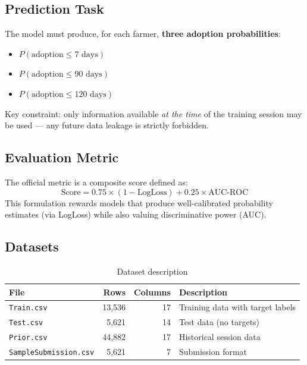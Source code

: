 \documentclass[12pt,a4paper]{article}
\begin{document}
\subsection{Prediction Task}

The model must produce, for each farmer, \textbf{three adoption probabilities}:
\begin{itemize}[noitemsep]
    \item $P(\text{adoption} \leq 7 \text{ days})$
    \item $P(\text{adoption} \leq 90 \text{ days})$
    \item $P(\text{adoption} \leq 120 \text{ days})$
\end{itemize}

\noindent Key constraint: only information available \textit{at the time} of the training session may be used --- any future data leakage is strictly forbidden.

\subsection{Evaluation Metric}

The official metric is a composite score defined as:
\begin{equation}
    \text{Score} = 0.75 \times (1 - \text{LogLoss}) + 0.25 \times \text{AUC-ROC}
\end{equation}
This formulation rewards models that produce well-calibrated probability estimates (via LogLoss) while also valuing discriminative power (AUC).

\subsection{Datasets}

\begin{table}[H]
\centering
\caption{Dataset description}
\begin{tabular}{lrrp{6cm}}
\toprule
\textbf{File} & \textbf{Rows} & \textbf{Columns} & \textbf{Description} \\
\midrule
\texttt{Train.csv} & 13,536 & 17 & Training data with target labels \\
\texttt{Test.csv}  & 5,621  & 14 & Test data (no targets) \\
\texttt{Prior.csv} & 44,882 & 17 & Historical session data \\
\texttt{SampleSubmission.csv} & 5,621 & 7 & Submission format \\
\bottomrule
\end{tabular}
\end{table}
\end{document}
